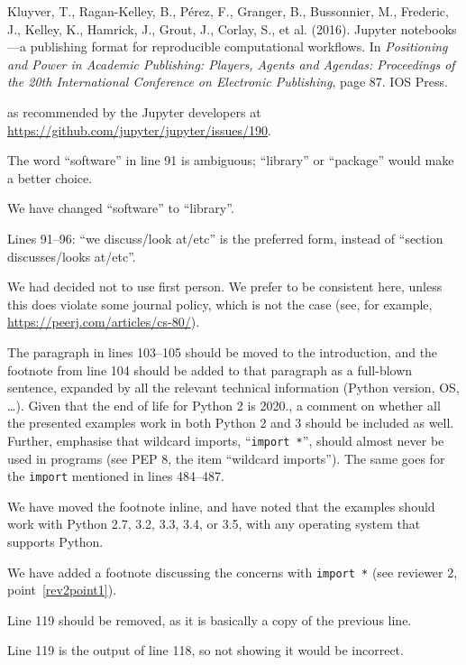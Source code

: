\documentclass[answers,12pt]{exam}
\begin{document}
\begin{questions}
\begin{solution}
Kluyver, T., Ragan-Kelley, B., P{\'e}rez, F.,
Granger, B., Bussonnier, M., Frederic, J., Kelley, K., Hamrick, J., Grout,
J., Corlay, S., et al. (2016). Jupyter notebooks---a publishing format for
reproducible computational workflows. In \textit{Positioning and Power in Academic
Publishing: Players, Agents and Agendas: Proceedings of the 20th International
Conference on Electronic Publishing}, page 87. IOS Press.

as recommended by the Jupyter developers at \url{https://github.com/jupyter/jupyter/issues/190}.
\end{solution}

\question The word ``software'' in line 91 is ambiguous; ``library'' or ``package'' would make a better choice.
\begin{solution}
We have changed ``software'' to ``library''.
\end{solution}

\question Lines 91--96: ``we discuss/look at/etc'' is the preferred form, instead of ``section discusses/looks at/etc''.
\begin{solution}
We had decided not to use first person.  We prefer to be
consistent here, unless this does violate some journal policy,
which is not the case (see, for example,
\url{https://peerj.com/articles/cs-80/}).
\end{solution}

\question The paragraph in lines 103--105 should be moved to the introduction,
and the footnote from line 104 should be added to that paragraph as a
full-blown sentence, expanded by all the relevant technical information
(Python version, OS, \ldots). Given that the end of life for Python 2 is
2020., a comment on whether all the presented examples work in both Python 2
and 3 should be included as well. Further, emphasise that wildcard imports,
``\texttt{import *}'', should almost never be used in programs (see PEP 8, the
item ``wildcard imports''). The same goes for the \texttt{import} mentioned in lines 484--487.
\begin{solution}
We have moved the footnote inline, and have noted that the examples should
work with Python 2.7, 3.2, 3.3, 3.4, or 3.5, with any operating system that
supports Python.

We have added a footnote discussing the concerns with \texttt{import *} (see
reviewer 2, point~\ref{rev2point1}).
\end{solution}

\question Line 119 should be removed, as it is basically a copy of the previous line.
\begin{solution}
Line 119 is the output of line 118, so not showing it would
be incorrect.


\end{solution}
\end{questions}
\end{document}
